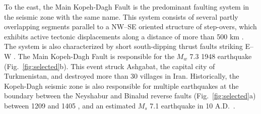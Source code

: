 To the east, the Main Kopeh-Dagh Fault is the predominant faulting system in the seismic zone with the same name. This system consists of several partly overlapping segments parallel to a NW--SE oriented structure of step-overs, which exhibits active tectonic displacements along a distance of more than 500 km \citep{Trifonov1978}. The system is also characterized by short south-dipping thrust faults striking E--W \citep{Berberian2001}. The Main Kopeh-Dagh Fault is responsible for the $M_w$ 7.3 1948 earthquake (Fig.~\ref{fig:selected}b). This event struck Ashgabat, the capital city of Turkmenistan, and destroyed more than 30 villages in Iran. Historically, the Kopeh-Dagh seismic zone is also responsible for multiple earthquakes at the boundary between the Neyshabur and Binalud reverse faults (Fig.~\ref{fig:selected}a) between 1209 and 1405 \citep{Berberian1999}, and an estimated $M_s$ 7.1 earthquake in 10 A.D.~\citep{Berberian2001}.
